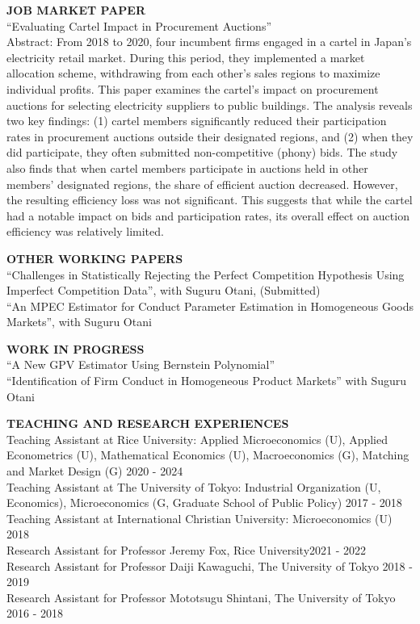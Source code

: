 \documentclass[10pt]{article}
\begin{document}
\textbf{JOB MARKET PAPER}\\
“Evaluating Cartel Impact in Procurement Auctions”\\
Abstract: From 2018 to 2020, four incumbent firms engaged in a cartel in Japan's electricity retail market. During this period, they implemented a market allocation scheme, withdrawing from each other's sales regions to maximize individual profits. This paper examines the cartel's impact on procurement auctions for selecting electricity suppliers to public buildings.
The analysis reveals two key findings: (1) cartel members significantly reduced their participation rates in procurement auctions outside their designated regions, and (2) when they did participate, they often submitted non-competitive (phony) bids.
The study also finds that when cartel members participate in auctions held in other members' designated regions, the share of efficient auction decreased. 
However, the resulting efficiency loss was not significant. 
This suggests that while the cartel had a notable impact on bids and participation rates, its overall effect on auction efficiency was relatively limited.

\vspace{10pt}

\textbf{OTHER WORKING PAPERS} \\
“Challenges in Statistically Rejecting the Perfect Competition Hypothesis Using Imperfect Competition Data”, with Suguru Otani, (Submitted) \\
“An MPEC Estimator for Conduct Parameter Estimation in Homogeneous Goods Markets”, with Suguru Otani

\vspace{10pt}

\textbf{WORK IN PROGRESS} \\
“A New GPV Estimator Using Bernstein Polynomial” \\
“Identification of Firm Conduct in Homogeneous Product Markets” with Suguru Otani

\vspace{10pt}

\textbf{TEACHING AND RESEARCH EXPERIENCES} \\
Teaching Assistant at Rice University: Applied Microeconomics (U), Applied Econometrics (U), Mathematical Economics (U), Macroeconomics (G), Matching and Market Design (G) \hfill 2020 - 2024\\
Teaching Assistant at The University of Tokyo: Industrial Organization (U, Economics), Microeconomics (G, Graduate School of Public Policy) \hfill  2017 - 2018\\
Teaching Assistant at International Christian University: Microeconomics (U) \hfill 2018\\
Research Assistant for Professor Jeremy Fox, Rice University\hfill 2021 - 2022\\
Research Assistant for Professor Daiji Kawaguchi, The University of Tokyo \hfill 2018 - 2019\\
Research Assistant for Professor Mototsugu Shintani, The University of Tokyo \hfill 2016 - 2018
\end{document}
